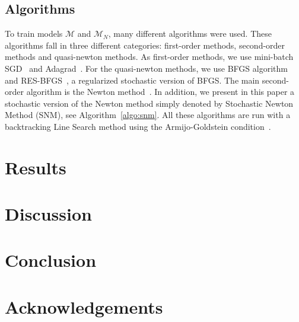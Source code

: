 \documentclass[conference]{IEEEtran}
\begin{document}
\subsection{Algorithms}

To train models $\mathcal{M}$ and $\mathcal{M}_N$, many different algorithms were used. These algorithms fall in three different categories: first-order methods, second-order methods and quasi-newton methods. As first-order methods, we use mini-batch SGD~\cite{ruder_overview_2016} and Adagrad~\cite{duchi_adaptive_2011}. For the quasi-newton methods, we use BFGS algorithm~\cite{fletcher_practical_1987} and RES-BFGS~\cite{mokhtari_res:_2014}, a regularized stochastic version of BFGS. The main second-order algorithm is the Newton method~\cite{caswell_treatise_1685}. In addition, we present in this paper a stochastic version of the Newton method simply denoted by Stochastic Newton Method (SNM), see Algorithm~\ref{algo:snm}. All these algorithms are run with a backtracking Line Search method using the Armijo-Goldstein condition~\cite{armijo_minimization_1966}.

\section{Results}


\section{Discussion}

\section{Conclusion}

\section{Acknowledgements} 



\end{document}
